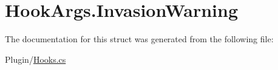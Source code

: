 \hypertarget{structOTA_1_1Plugin_1_1HookArgs_1_1InvasionWarning}{}\section{Hook\+Args.\+Invasion\+Warning}
\label{structOTA_1_1Plugin_1_1HookArgs_1_1InvasionWarning}


The documentation for this struct was generated from the following file\+:\begin{DoxyCompactItemize}
\item 
Plugin/\hyperlink{Hooks_8cs}{Hooks.\+cs}\end{DoxyCompactItemize}
